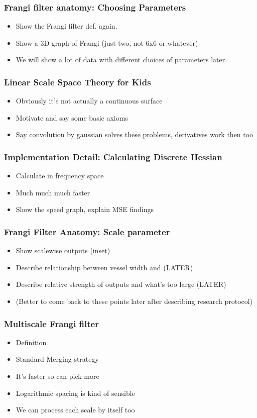 \documentclass[9pt,notes]{beamer}
\begin{document}
\begin{frame}
\frametitle[Frangi parameters]{Frangi filter anatomy: Choosing Parameters}
\begin{itemize}
\item Show the Frangi filter def. again.
\item Show a 3D graph of Frangi (just two, not 6x6 or whatever)
\item We will show a lot of data with different choices of parameters later.
\end{itemize}
\end{frame}

\begin{frame}
\frametitle[Scale Space Theory]{Linear Scale Space Theory for Kids}
\begin{itemize}
  \item Obviously it's not actually a continuous surface
  \item Motivate and say some basic axioms
  \item Say convolution by gaussian solves these problems, derivatives work then too
\end{itemize}
\end{frame}

\begin{frame}
\frametitle{Implementation Detail: Calculating Discrete Hessian}
\begin{itemize}
  \item Calculate in frequency space
  \item Much much much faster
  \item Show the speed graph, explain MSE findings
\end{itemize}
\end{frame}

\begin{frame}
\frametitle{Frangi Filter Anatomy: Scale parameter}
\begin{itemize}
  \item Show scalewise outputs (inset)
  \item Describe relationship between vessel width and (LATER)
  \item Describe relative strength of outputs and what's too large (LATER)
  \item (Better to come back to these points later after describing research protocol)
\end{itemize}
\end{frame}

\begin{frame}
\frametitle{Multiscale Frangi filter}
\begin{itemize}
  \item Definition
  \item Standard Merging strategy
  \item It's faster so can pick more
  \item Logarithmic spacing is kind of sensible
  \item We can process each scale by itself too
\end{itemize}
\end{frame}
\end{document}
